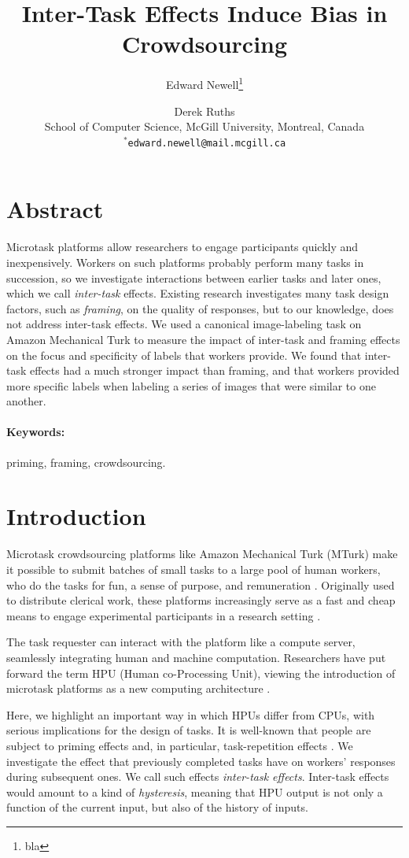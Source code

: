 \documentclass[letterpaper]{article}
\title{Inter-Task Effects Induce Bias in Crowdsourcing}
\author{Edward Newell\footnote{bla} \and Derek Ruths\\
School of Computer Science, McGill University, Montreal, Canada\\
$^*$\texttt{edward.newell@mail.mcgill.ca}\\
}
\begin{document}
\maketitle
\section*{Abstract}
Microtask platforms allow researchers to engage participants quickly and 
inexpensively.
Workers on such platforms probably perform many tasks in succession,
so we investigate interactions between earlier tasks and later ones, which we 
call \textit{inter-task} effects.  
Existing research investigates many task design factors, such as 
\textit{framing}, on the quality of responses, but to our knowledge, does not 
address inter-task effects.  
We used a canonical image-labeling task on Amazon Mechanical Turk 
to measure the impact of inter-task and framing effects on the focus and 
specificity of labels that workers provide.
We found that inter-task effects had a much stronger impact than framing, 
and that workers provided more specific labels when labeling 
a series of images that were similar to one another.

\paragraph{Keywords:} priming, framing, crowdsourcing.
\section*{Introduction}
Microtask crowdsourcing platforms like Amazon Mechanical Turk (MTurk) make it 
possible to submit batches of small tasks to a large pool of human workers, 
who do the tasks for fun, a sense of purpose, and remuneration 
\cite{kazai2013analysis,Antin20122925}.  
Originally used to distribute clerical work, these platforms 
increasingly serve as a fast and cheap means to engage experimental 
participants in a research 
setting \cite{snow2008cheap}.  

The task requester can interact with the platform like a compute server, 
seamlessly 
integrating human and machine computation.  Researchers have put forward the 
term HPU (Human co-Processing Unit), viewing the introduction of 
microtask platforms as a new computing architecture
\cite{5543192}.  

Here, we highlight an important way in which HPUs differ from CPUs, with 
serious implications for the design of tasks.  It is well-known that people 
are subject to priming effects 
\cite{BJOP1796,No2007,beller1971priming} and, in particular, task-repetition effects
\cite{Gass1999549,sohn2001task}.  
We investigate the effect that previously completed tasks have on workers'
responses during subsequent ones. We call such effects 
\textit{inter-task effects}.  Inter-task effects would amount to a kind of
\textit{hysteresis}, meaning that HPU output is not only a function of the 
current input, but also of the history of inputs.
\end{document}
